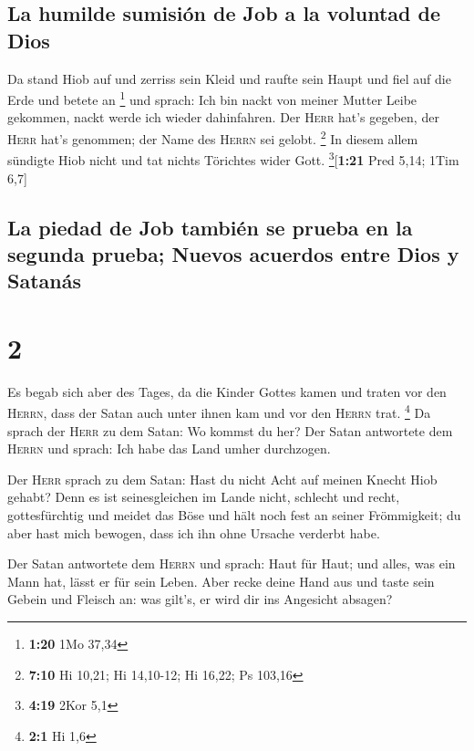 \hypertarget{la-humilde-sumisiuxf3n-de-job-a-la-voluntad-de-dios}{%
\subsection{La humilde sumisión de Job a la voluntad de
Dios}\label{la-humilde-sumisiuxf3n-de-job-a-la-voluntad-de-dios}}

 Da stand Hiob auf und zerriss sein Kleid und raufte sein
Haupt und fiel auf die Erde und betete an \footnote{\textbf{1:20} 1Mo
  37,34}  und sprach: Ich bin nackt von meiner Mutter
Leibe gekommen, nackt werde ich wieder dahinfahren. Der \textsc{Herr}
hat's gegeben, der \textsc{Herr} hat's genommen; der Name des
\textsc{Herrn} sei gelobt. \footnote{\textbf{7:10} Hi 10,21; Hi
  14,10-12; Hi 16,22; Ps 103,16}  In diesem allem
sündigte Hiob nicht und tat nichts Törichtes wider Gott.
\footnote{\textbf{4:19} 2Kor 5,1}{[}\textbf{1:21} Pred 5,14; 1Tim 6,7{]}

\hypertarget{la-piedad-de-job-tambiuxe9n-se-prueba-en-la-segunda-prueba-nuevos-acuerdos-entre-dios-y-satanuxe1s}{%
\subsection{La piedad de Job también se prueba en la segunda prueba;
Nuevos acuerdos entre Dios y
Satanás}\label{la-piedad-de-job-tambiuxe9n-se-prueba-en-la-segunda-prueba-nuevos-acuerdos-entre-dios-y-satanuxe1s}}

\hypertarget{section-1}{%
\section{2}\label{section-1}}

 Es begab sich aber des Tages, da die Kinder Gottes kamen
und traten vor den \textsc{Herrn}, dass der Satan auch unter ihnen kam
und vor den \textsc{Herrn} trat. \footnote{\textbf{2:1} Hi 1,6}
 Da sprach der \textsc{Herr} zu dem Satan: Wo kommst du
her? Der Satan antwortete dem \textsc{Herrn} und sprach: Ich habe das
Land umher durchzogen.

 Der \textsc{Herr} sprach zu dem Satan: Hast du nicht Acht
auf meinen Knecht Hiob gehabt? Denn es ist seinesgleichen im Lande
nicht, schlecht und recht, gottesfürchtig und meidet das Böse und hält
noch fest an seiner Frömmigkeit; du aber hast mich bewogen, dass ich ihn
ohne Ursache verderbt habe.

 Der Satan antwortete dem \textsc{Herrn} und sprach: Haut
für Haut; und alles, was ein Mann hat, lässt er für sein Leben.
 Aber recke deine Hand aus und taste sein Gebein und
Fleisch an: was gilt's, er wird dir ins Angesicht absagen?

